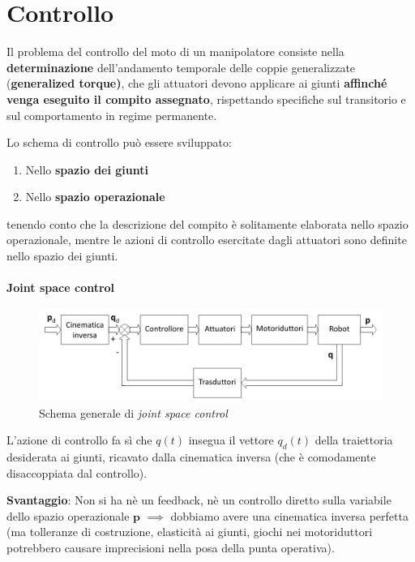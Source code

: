 \chapter{Controllo}

Il problema del controllo del moto di un manipolatore consiste nella \textbf{determinazione} dell’andamento temporale delle coppie generalizzate (\textbf{generalized torque)}, che gli attuatori devono applicare ai giunti \textbf{affinché venga eseguito il compito assegnato}, rispettando specifiche sul transitorio e sul comportamento in regime permanente.

Lo schema di controllo può essere sviluppato:
\begin{enumerate}
	\item Nello \textbf{spazio dei giunti}
	\item Nello \textbf{spazio operazionale}
\end{enumerate}

tenendo conto che la descrizione del compito è solitamente elaborata nello spazio operazionale, mentre le azioni di controllo esercitate dagli attuatori sono definite nello spazio dei giunti.\\

\subsubsection{Joint space control}
\begin{figure}[!ht]
	\centering
	\includegraphics[width=0.7\linewidth]{images/joint_control_1}
	\caption{Schema generale di \textit{joint space control}}
	\label{fig:jointcontrol1}
\end{figure}

L’azione di controllo fa sì che $q(t)$ insegua il vettore $q_d(t)$ della traiettoria desiderata ai giunti, ricavato dalla cinematica inversa (che è comodamente disaccoppiata dal controllo).

\textbf{Svantaggio}: Non si ha nè un feedback, nè un controllo diretto sulla variabile dello spazio operazionale $\mathbf{p}$ $\implies$ dobbiamo avere una cinematica inversa perfetta (ma tolleranze di costruzione, elasticità ai giunti, giochi nei motoriduttori potrebbero causare imprecisioni nella posa della punta operativa).\\



